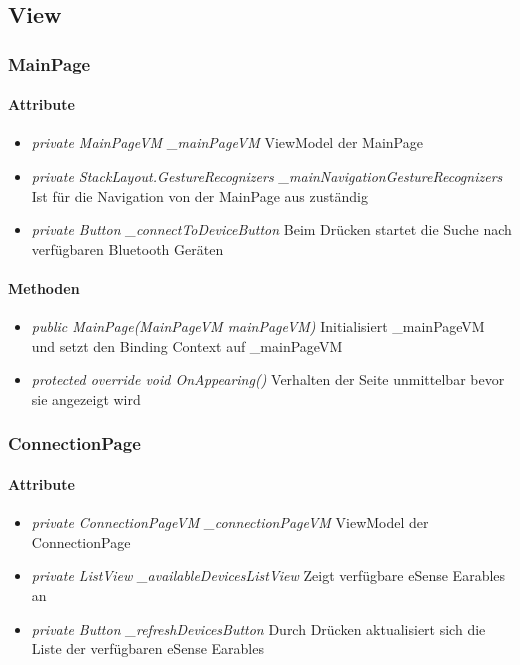 \documentclass[../entwurf.tex]{subfiles}
\begin{document}
\newcommand{\attr}[1]{\item \textit{#1}}

\subsection{View}
\subsubsection{MainPage}

\paragraph{Attribute}

\begin{itemize}
	\attr{private MainPageVM \_mainPageVM} ViewModel der MainPage
	\attr{private StackLayout.GestureRecognizers \_mainNavigationGestureRecognizers} Ist für die Navigation von der MainPage aus zuständig
	\attr{private Button \_connectToDeviceButton} Beim Drücken startet die Suche nach verfügbaren Bluetooth Geräten
\end{itemize}

\paragraph{Methoden}
\begin{itemize}
	\attr{public MainPage(MainPageVM mainPageVM)} Initialisiert \_mainPageVM und setzt den Binding Context 			auf \_mainPageVM  
	\attr{protected override void OnAppearing()} Verhalten der Seite unmittelbar bevor sie angezeigt wird
\end{itemize}

\subsubsection{ConnectionPage}

\paragraph{Attribute}
\begin{itemize}
	\attr{private ConnectionPageVM \_connectionPageVM} ViewModel der ConnectionPage
	\attr{private ListView \_availableDevicesListView} Zeigt verfügbare eSense Earables an
	\attr{private Button \_refreshDevicesButton} Durch Drücken aktualisiert sich die Liste der verfügbaren eSense Earables
\end{itemize}
\end{document}
